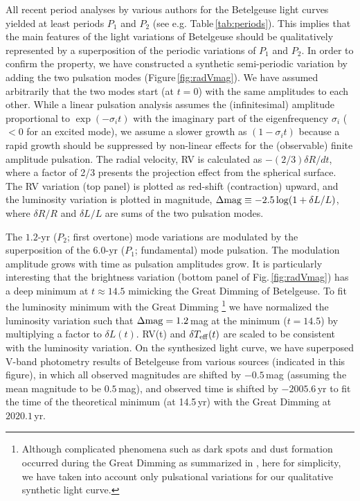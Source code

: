 \documentclass[fleqn,usenatbib]{mnras}
\begin{document}
All recent period analyses by various authors for the Betelgeuse light curves 
yielded at least periods $P_1$ and $P_2$ (see e.g. Table\,\ref{tab:periods}).
This implies that the main features of the light variations of Betelgeuse
should be qualitatively represented by a superposition of the periodic
variations of $P_1$ and $P_2$.  
In order to confirm the property, we have constructed a synthetic semi-periodic 
variation by adding the two pulsation modes (Figure\,\ref{fig:radVmag}).
We have assumed arbitrarily that the two modes start (at $t=0$) 
with the same amplitudes to each other.
While a linear pulsation analysis assumes the (infinitesimal) amplitude 
proportional to $\exp(-\sigma_it)$ with the imaginary part of 
the eigenfrequency $\sigma_i$ ($<0$ for an excited mode), we assume 
a slower growth as $(1 - \sigma_i t)$ because a rapid growth should be 
suppressed by non-linear effects for the (observable) finite amplitude pulsation.
The radial velocity, RV is calculated as $-(2/3)\delta R/dt$, where a factor of 2/3
presents the projection effect from the spherical surface.
The RV variation (top panel) is plotted as red-shift (contraction) upward, and
the luminosity variation is plotted in magnitude,
$\Delta{\rm mag}\equiv-2.5\log(1+\delta L/L)$, where $\delta R/R$ 
and $\delta L/L$ are sums of the two pulsation modes. 

The $1.2$-yr ($P_2$; first overtone) mode variations are modulated by the superposition
of the $6.0$-yr ($P_1$; fundamental) mode pulsation.  
The modulation amplitude grows with time as pulsation amplitudes grow.
It is particularly interesting that the brightness variation 
(bottom panel of Fig.\,\ref{fig:radVmag})
has a deep minimum at $t\approx14.5$ mimicking the Great Dimming of Betelgeuse.
To fit the luminosity minimum with the Great Dimming
\footnote{Although complicated phenomena such as dark spots and dust formation occurred during the Great Dimming as summarized in \citet{Wheeler2023}, 
here for simplicity, we have taken into account only pulsational variations for our qualitative synthetic light curve.}  
we have normalized the luminosity variation such that 
$\Delta{\rm mag} = 1.2$\,mag at the
minimum ($t=14.5$) by multiplying a factor to $\delta L(t)$. 
RV(t) and $\delta T_{\rm eff}(t)$ are scaled to be consistent with
the luminosity variation. 
On the synthesized light curve, we have superposed V-band photometry
 results of Betelgeuse from various sources (indicated in this figure), in which all
observed magnitudes are shifted by $-0.5$\,mag (assuming the mean magnitude to
be $0.5$\,mag), and observed time is shifted by $-2005.6$\,yr to fit
the time of the theoretical minimum (at 14.5\,yr) with 
the Great Dimming at $2020.1$\,yr. 
\end{document}
